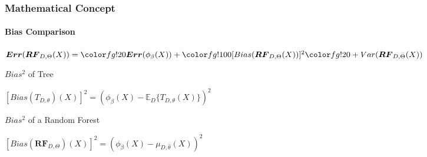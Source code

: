 \begin{frame}[t]
    \frametitle{Mathematical Concept}
    \framesubtitle{Bias Comparison}
    \begin{block}{}
        \begin{center}
            $\boldsymbol{Err}(\boldsymbol{RF}_{D, \Theta}(X)) =
            \semitransp{\boldsymbol{Err}(\phi_{\beta}(X)) +}
            \nontransp{[Bias(\boldsymbol{RF}_{D, \Theta}(X))]^2 }
            \semitransp{+ Var(\boldsymbol{RF}_{D, \Theta}(X))}$
        \end{center}
    \end{block}
    \vspace{0.5cm}
    \begin{block}{$Bias^2$ of Tree}        
        \begin{center}
            $[Bias(T_{D,\theta})(X)]^2 = (\phi_{\beta}(X) - \mathbb{E}_{D}\{T_{D,\theta}(X)\})^2$
        \end{center}
    \end{block}
    \bigbreak
    \begin{block}{$Bias^2$ of a Random Forest}
        \begin{center}
            $[Bias(\boldsymbol{RF}_{D,\Theta})(X)]^2 = (\phi_{\beta}(X) - \mu_{D,\hat{\theta}}(X))^2$
        \end{center}
    \end{block}
    \bigbreak
\end{frame}
